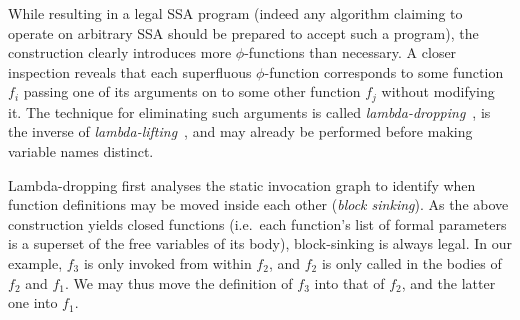 While resulting in a legal SSA program (indeed any algorithm claiming
to operate on arbitrary SSA should be prepared to accept such a
program), the construction clearly introduces more $\phi$-functions
than necessary. A closer inspection reveals that each superfluous
$\phi$-function corresponds to some function $f_i$ passing one of its
arguments on to some other function $f_j$ without modifying it. The
technique for eliminating such arguments is called
\emph{lambda-dropping}~\cite{DBLP:journals/tcs/DanvyS00}, is the inverse of
\emph{lambda-lifting}~\cite{DBLP:conf/fpca/Johnsson85}, and may already be performed before
making variable names distinct.

Lambda-dropping first analyses the static invocation graph to identify
when function definitions may be moved inside each other (\emph{block
sinking}). As the above construction yields closed functions
(i.e.~each function's list of formal parameters is a superset of the
free variables of its body), block-sinking is always legal. In our
example, $f_3$ is only invoked from within $f_2$, and $f_2$ is only
called in the bodies of $f_2$ and $f_1$.  We may thus move the
definition of $f_3$ into that of $f_2$, and the latter one into $f_1$.

